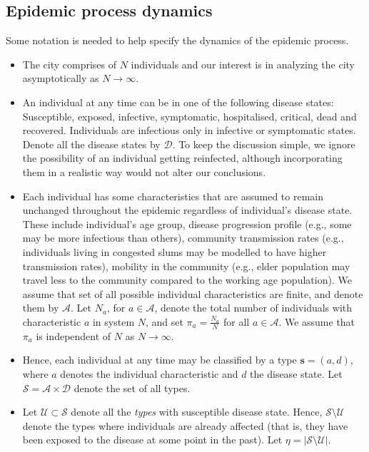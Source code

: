\documentclass{article}
\theoremstyle{definition}
\begin{document}
\subsection{Epidemic process dynamics}
\label{epidemic_process}
Some notation is needed to help specify the dynamics of the epidemic process.
   \begin{itemize}
       \item 
       The city comprises of $N$ individuals and our interest is in analyzing the city asymptotically as $N \rightarrow \infty$.
       \item
       An individual at any time can be in one of the following disease states: Susceptible, exposed, infective, symptomatic, hospitalised, critical, dead and recovered.  Individuals are infectious only in infective or symptomatic states. Denote all the disease states  by $\mathcal D$. To keep the discussion
       simple, we ignore the possibility of an individual getting reinfected, although incorporating them in a realistic way would not alter our conclusions.
       \item
       Each individual has some characteristics that are assumed to remain unchanged throughout the epidemic regardless of individual's  disease state. These include individual's age group, disease progression profile (e.g., some may be more infectious than others), 
       community transmission rates (e.g., individuals living in congested slums may be modelled to have higher transmission rates), 
       mobility in the community (e.g., elder population may travel less to the community compared to the working age population).  We 
       assume that set of all possible individual characteristics are finite, and  denote them by $\mathcal A$.
        Let $N_{a}$,  for $a \in \mathcal A$, denote the total number of individuals  with  characteristic $a$ in system $N$,
        and set  $ \pi_{a} =  \frac{N_{a}}{N}$ for all $a\in \mathcal A$. We assume that $\pi_{a}$ is independent of $N$ as $N \rightarrow \infty$.
     
       \item Hence,  each individual at any time may be classified by a  type $\bm{s} =(a,d)$, where $a$ denotes 
       the individual characteristic and $d$ the disease state. Let $\mathcal S = \mathcal A \times \mathcal D$
       denote the set of all types.  
       \item
Let $\mathcal U \subset \mathcal S$  denote all the \textit{types}  with susceptible disease state. Hence, $\mathcal S \setminus \mathcal U$ denote the types where individuals are already affected (that is, they have been exposed to the disease at some point in the past). Let $\eta = \lvert \mathcal S \setminus \mathcal U \rvert$.      
        

\end{itemize}
\end{document}
